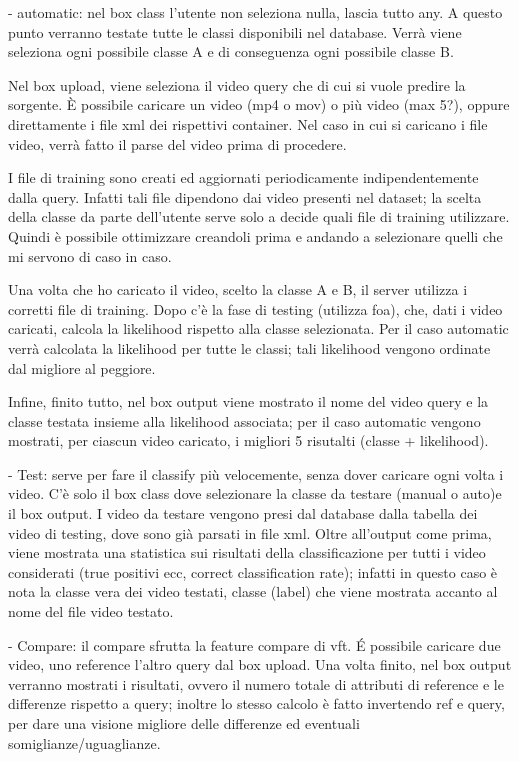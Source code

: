  - automatic:
  nel box class l'utente non seleziona nulla, lascia tutto any. A questo punto verranno testate tutte le classi disponibili nel database. Verrà viene seleziona ogni possibile classe A e di conseguenza ogni possibile classe B.

 Nel box upload, viene seleziona il video query che di cui si vuole predire la sorgente. È possibile caricare un video (mp4 o mov) o più video (max 5?), oppure direttamente i file xml dei rispettivi container. Nel caso in cui si caricano i file video, verrà fatto il parse del video prima di procedere.

 I file di training sono creati ed aggiornati periodicamente indipendentemente dalla query. Infatti tali file dipendono dai video presenti nel dataset; la scelta della classe da parte dell'utente serve solo a decide quali file di training utilizzare. Quindi è possibile ottimizzare creandoli prima e andando a selezionare quelli che mi servono di caso in caso.

 Una volta che ho caricato il video, scelto la classe A e B, il server utilizza i corretti file di training. Dopo c'è la fase di testing (utilizza foa), che, dati i video caricati, calcola la likelihood rispetto alla classe selezionata. Per il caso automatic verrà calcolata la likelihood per tutte le classi; tali likelihood vengono ordinate dal migliore al peggiore.

 Infine, finito tutto, nel box output viene mostrato il nome del video query e la classe testata insieme alla likelihood associata; per il caso automatic vengono mostrati, per ciascun video caricato, i migliori 5 risutalti (classe + likelihood).

- Test:
 serve per fare il classify più velocemente, senza dover caricare ogni volta i video. C'è solo il box class dove selezionare la classe da testare (manual o auto)e il box output. I video da testare vengono presi dal database dalla tabella dei video di testing, dove sono già parsati in file xml. Oltre all'output come prima, viene mostrata una statistica sui risultati della classificazione per tutti i video considerati (true positivi ecc, correct classification rate); infatti in questo caso è nota la classe vera dei video testati, classe (label) che viene mostrata accanto al nome del file video testato.

- Compare:
 il compare sfrutta la feature compare di vft. É possibile caricare due video, uno reference l'altro query dal box upload. Una volta finito, nel box output verranno mostrati i risultati, ovvero il numero totale di attributi di reference e le differenze rispetto a query; inoltre lo stesso calcolo è fatto invertendo ref e query, per dare una visione migliore delle differenze ed eventuali somiglianze/uguaglianze.


